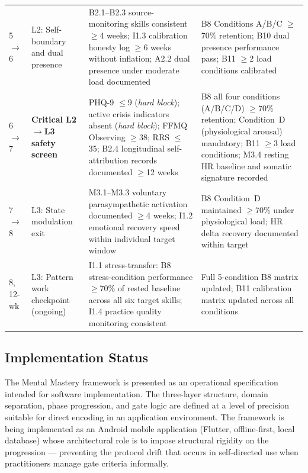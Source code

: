 \documentclass[12pt, a4paper]{article}
\begin{document}
\begin{longtable}{p{1.1cm} p{2.3cm} p{4.9cm} p{4.9cm}}
5$\to$6 &
  L2: Self-boundary and dual presence &
  B2.1--B2.3 source-monitoring skills consistent $\geq$4 weeks; I1.3 calibration honesty log $\geq$6 weeks without inflation; A2.2 dual presence under moderate load documented &
  B8 Conditions A/B/C $\geq$70\% retention; B10 dual presence performance pass; B11 $\geq$2 load conditions calibrated \\[4pt]

6$\to$7 &
  \textbf{Critical L2$\to$L3 safety screen} &
  PHQ-9 $\leq$9 (\emph{hard block}); active crisis indicators absent (\emph{hard block}); FFMQ Observing $\geq$38; RRS $\leq$35; B2.4 longitudinal self-attribution records documented $\geq$12 weeks &
  B8 all four conditions (A/B/C/D) $\geq$70\% retention; Condition~D (physiological arousal) mandatory; B11 $\geq$3 load conditions; M3.4 resting HR baseline and somatic signature recorded \\[4pt]

7$\to$8 &
  L3: State modulation exit &
  M3.1--M3.3 voluntary parasympathetic activation documented $\geq$4 weeks; I1.2 emotional recovery speed within individual target window &
  B8 Condition~D maintained $\geq$70\% under physiological load; HR delta recovery documented within target \\[4pt]

8, 12-wk &
  L3: Pattern work checkpoint (ongoing) &
  I1.1 stress-transfer: B8 stress-condition performance $\geq$70\% of rested baseline across all six target skills; I1.4 practice quality monitoring consistent &
  Full 5-condition B8 matrix updated; B11 calibration matrix updated across all conditions \\

\end{longtable}

\subsection{Implementation Status}

The Mental Mastery framework is presented as an operational specification
intended for software implementation. The three-layer structure, domain
separation, phase progression, and gate logic are defined at a level of
precision suitable for direct encoding in an application environment. The
framework is being implemented as an Android mobile application (Flutter,
offline-first, local database) whose architectural role is to impose structural
rigidity on the progression --- preventing the protocol drift that occurs in
self-directed use when practitioners manage gate criteria informally.
\end{document}
